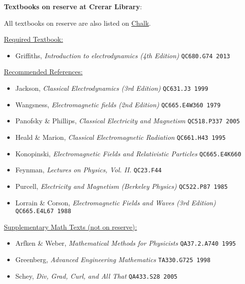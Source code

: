 \textbf {\Large \sc Textbooks on reserve at Crerar Library}:

All textbooks on reserve are also listed on \href{https://chalk.uchicago.edu}{Chalk}.

\vspace{1cm}

\underline{Required Textbook:}

  \begin{itemize}
    \item Griffiths, \textit{Introduction to electrodynamics (4th Edition)} \texttt{QC680.G74 2013}
  \end{itemize}
  
  
\underline{Recommended References:}

  \begin{itemize}
    \item Jackson, \textit{Classical Electrodynamics (3rd Edition)} \texttt{QC631.J3 1999}
    \item Wangsness, \textit{Electromagnetic fields (2nd Edition)} \texttt{QC665.E4W360 1979}
    \item Panofsky \& Phillips, \textit{Classical Electricity and Magnetism} \texttt{QC518.P337 2005}
    \item Heald \& Marion, \textit{Classical Electromagnetic Radiation} \texttt{QC661.H43 1995}
    \item Konopinski, \textit{Electromagnetic Fields and Relativistic Particles} \texttt{QC665.E4K660}
    \item Feynman, \textit{Lectures on Physics, Vol. II.} \texttt{QC23.F44}
    \item Purcell, \textit{Electricity and Magnetism (Berkeley Physics)} \texttt{QC522.P87 1985}
    \item Lorrain \& Corson, \textit{Electromagnetic Fields and Waves (3rd Edition)} \texttt{QC665.E4L67 1988}
  \end{itemize}
  

\underline{Supplementary Math Texts (not on reserve):}

  \begin{itemize}
    \item Arfken \& Weber, \textit{Mathematical Methods for Physicists} \texttt{QA37.2.A740 1995}
    \item Greenberg, \textit{Advanced Engineering Mathematics} \texttt{TA330.G725 1998}
    \item Schey, \textit{Div, Grad, Curl, and All That} \texttt{QA433.S28 2005}
  \end{itemize}  
  